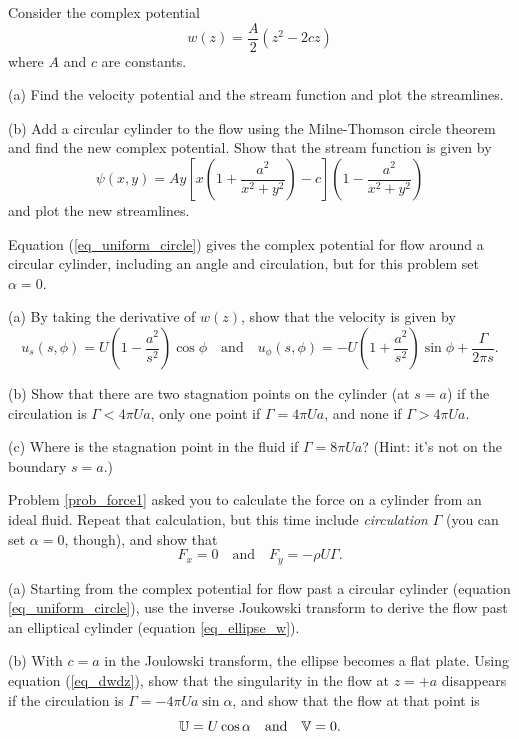\begin{problem}
Consider the complex potential
\[
w(z) = \frac{A}{2} (z^2 - 2cz)
\]
where $A$ and $c$ are constants.  

(a) Find the velocity potential and the stream function and plot the streamlines.

(b) Add a circular cylinder to the flow using the Milne-Thomson circle theorem and find the new complex potential.  Show that the stream function is given by
\[
\psi(x, y) = Ay \left[ x \left( 1 + \frac{a^2}{x^2 + y^2} \right) - c\right] \left(1 - \frac{a^2}{x^2 + y^2} \right)
\]
and plot the new streamlines.
\end{problem}

\begin{problem}
\label{prob_circlular_cylinder}
Equation (\ref{eq_uniform_circle}) gives the complex potential for flow around a circular cylinder, including an angle and circulation, but for this problem set $\alpha = 0$.  

(a) By taking the derivative of $w(z)$, show that the velocity is given by
\[
u_s(s, \phi) = U \left( 1 - \frac{a^2}{s^2} \right) \cos \phi \quad \text{and} \quad u_\phi(s, \phi) = -U \left( 1 + \frac{a^2}{s^2} \right) \sin \phi + \frac{\Gamma}{2\pi s}.
\]

(b) Show that there are two stagnation points on the cylinder (at $s = a$) if the circulation is $\Gamma < 4\pi U a$, only one point if $\Gamma = 4\pi U a$, and none if $\Gamma > 4\pi U a$. 

(c) Where is the stagnation point in the fluid if $\Gamma = 8 \pi U a$?  (Hint: it's not on the boundary $s=a$.)
\end{problem}

\begin{problem}
\label{prob_force2}
Problem \ref{prob_force1} asked you to calculate the force on a cylinder from an ideal fluid.  Repeat that calculation, but this time include \emph{circulation} $\Gamma$ (you can set $\alpha = 0$, though), and show that
\[
F_x = 0 \quad \text{and} \quad F_y = -\rho U \Gamma.
\]
\end{problem}

\begin{problem}
\label{prob_flat_plate}

(a) Starting from the complex potential for flow past a circular cylinder (equation \ref{eq_uniform_circle}), use the inverse Joukowski transform to derive the flow past an elliptical cylinder (equation \ref{eq_ellipse_w}).

(b) With $c = a$ in the Joulowski transform, the ellipse becomes a flat plate.  Using equation (\ref{eq_dwdz}), show that the singularity in the flow at $z = +a$ disappears if the circulation is $\Gamma = -4\pi U a \sin \alpha$, and show that the flow at that point is
\[
\mathbb{U} = U \cos \alpha \quad \text{and} \quad \mathbb{V} = 0.
\]
\end{problem}

